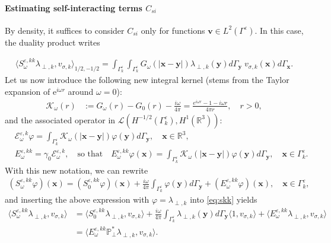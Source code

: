\documentclass[]{article}
\numberwithin{equation}{section}
\numberwithin{theorem}{section}
\numberwithin{lemma}{section}
\numberwithin{corollary}{section}
\numberwithin{proposition}{section}
\numberwithin{definition}{section}
\newcommand{\bx}{\boldsymbol{x}}
\newcommand{\by}{\boldsymbol{y}}
\newcommand{\re}{\varepsilon}
\renewcommand{\vec}{\boldsymbol}
\begin{document}
	\paragraph{Estimating self-interacting terms $C_{si}$}
	By density, it suffices to consider $C_{si}$ only for functions $\vec{v}\in L^2(\Gamma^{\re})$. In this case, the duality product writes
	
	\begin{align}
		\label{eq:skk}
		\langle  S^{\re,kk}_{\omega} \lambda_{\perp,k}, v_{\sigma,k}\rangle_{1/2, -1/2}=\int_{\Gamma^{\re}_k}\int_{\Gamma^{\re}_k}G_{\omega}(|\bx-\by|){\lambda}_{\perp,k}(\vec{y})d\Gamma_{\vec{y}}\; v_{\sigma,k}(\vec{x})d\Gamma_{\vec{x}}.
	\end{align}
	Let us now introduce the following new integral kernel (stems from the Taylor expansion of $\mathrm{e}^{i\omega r}$ around $\omega=0$): 
	\begin{align*}%
		\mathcal{K}_{\omega}(r) &:= G_{\omega}(r) - G_0(r) - \frac{i \omega}{4 \pi} = \frac{e^{i\omega r} - 1 - i \omega r}{4\pi r}, \quad r>0,
	\end{align*}
	and the associated operator in $\mathcal{L}(H^{-1/2}(\Gamma^{\re}_k), H^{1}(\mathbb{R}^{3}))$:
	\begin{align}
		\label{eq:Edefvol}
		&\mathcal{E}_{\omega}^{\re,k}\varphi=\int_{\Gamma^{\re}_k}\mathcal{K}_{\omega}(|\vec{x}-\vec{y}|)\varphi(\vec{y})d\Gamma_{\vec{y}},\quad \vec{x}\in \mathbb{R}^3,\\
		\nonumber
		&E_{\omega}^{\re,kk}=\gamma_0 \mathcal{E}_{\omega}^{\re,k}, \quad \text{so that}\quad E_{\omega}^{\re,kk}\varphi(\vec{x})=\int_{\Gamma^{\re}_k}\mathcal{K}_{\omega}(|\vec{x}-\vec{y}|)\varphi(\vec{y})d\Gamma_{\vec{y}},\quad 
		\vec{x}\in \Gamma^{\re}_k.
	\end{align}
	With this new notation, we can rewrite
	\begin{align*}%
		(S^{\re,kk}_{\omega}\varphi)(\bx) = (S_{0}^{\re,kk}\varphi)(\bx)+\frac{i\omega}{4\pi}\int_{\Gamma^{\re}_k}\varphi(\by) d\Gamma_{\by} + (E^{\re,kk}_{\omega}\varphi)(\bx), \quad \bx \in \Gamma^{\re}_k, 
	\end{align*}
	and inserting the above expression with $\varphi=\lambda_{\perp,k}$ into \eqref{eq:skk} yields 
	\begin{align*}%
		\langle  S^{\re,kk}_{\omega} \lambda_{\perp,k}, v_{\sigma,k}\rangle&=\langle S_{0}^{\re,kk}\lambda_{\perp,k}, v_{\sigma,k}\rangle+\frac{i\omega}{4\pi}\int_{\Gamma_k^{\re}}\lambda_{\perp,k}(\vec{y})d\Gamma_{\vec{y}}  \langle 1, v_{\sigma,k}\rangle+\langle E_{\omega}^{\re,kk} \lambda_{\perp,k}, v_{\sigma,k}\rangle\\
		&=\langle E_{\omega}^{\re,kk} \mathbb{P}_{\perp}^*\lambda_{\perp,k}, v_{\sigma,k}\rangle.
	\end{align*}
\end{document}
